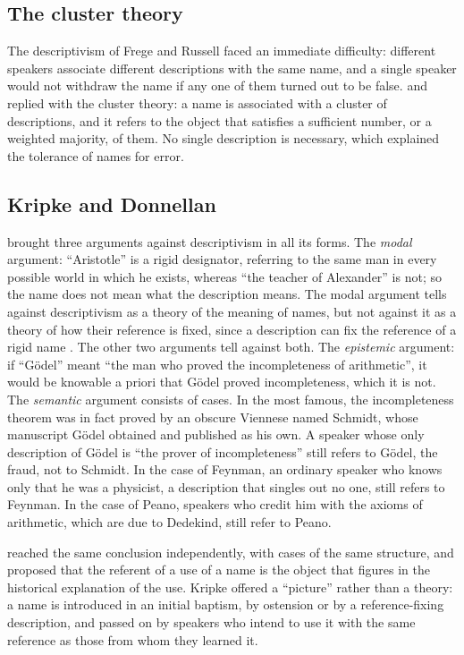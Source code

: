 \documentclass{situationist-preprint}
\begin{document}
\subsection{The cluster theory}

The descriptivism of Frege and Russell faced an immediate difficulty: different speakers associate different descriptions with the same name, and a single speaker would not withdraw the name if any one of them turned out to be false. \citet{Searle1958} and \citet{Strawson1959} replied with the cluster theory: a name is associated with a cluster of descriptions, and it refers to the object that satisfies a sufficient number, or a weighted majority, of them. No single description is necessary, which explained the tolerance of names for error.

\subsection{Kripke and Donnellan}

\citet{Kripke1980} brought three arguments against descriptivism in all its forms. The \emph{modal} argument: \enquote{Aristotle} is a rigid designator, referring to the same man in every possible world in which he exists, whereas \enquote{the teacher of Alexander} is not; so the name does not mean what the description means. The modal argument tells against descriptivism as a theory of the meaning of names, but not against it as a theory of how their reference is fixed, since a description can fix the reference of a rigid name \citep[Lecture~I]{Kripke1980}. The other two arguments tell against both. The \emph{epistemic} argument: if \enquote{G\"odel} meant \enquote{the man who proved the incompleteness of arithmetic}, it would be knowable a priori that G\"odel proved incompleteness, which it is not. The \emph{semantic} argument consists of cases. In the most famous, the incompleteness theorem was in fact proved by an obscure Viennese named Schmidt, whose manuscript G\"odel obtained and published as his own. A speaker whose only description of G\"odel is \enquote{the prover of incompleteness} still refers to G\"odel, the fraud, not to Schmidt. In the case of Feynman, an ordinary speaker who knows only that he was a physicist, a description that singles out no one, still refers to Feynman. In the case of Peano, speakers who credit him with the axioms of arithmetic, which are due to Dedekind, still refer to Peano.

\citet{Donnellan1970} reached the same conclusion independently, with cases of the same structure, and proposed that the referent of a use of a name is the object that figures in the historical explanation of the use. Kripke offered a \enquote{picture} rather than a theory: a name is introduced in an initial baptism, by ostension or by a reference-fixing description, and passed on by speakers who intend to use it with the same reference as those from whom they learned it.
\end{document}
